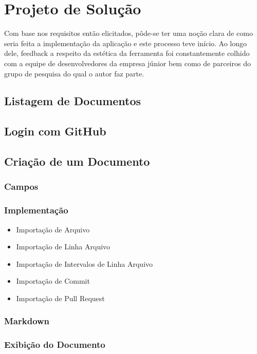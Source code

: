 \chapter{Projeto de Solução}

Com base nos requisitos então elicitados, pôde-se ter uma noção clara de como seria feita a implementação da aplicação e este processo teve início. Ao longo dele, feedback a respeito da estética da ferramenta foi constantemente colhido com a equipe de desenvolvedores da empresa júnior bem como de parceiros do grupo de pesquisa do qual o autor faz parte.

\section{Listagem de Documentos}

\section{Login com GitHub}

\section{Criação de um Documento}

\subsection{Campos}
\subsection{Implementação}

\begin{itemize}
  \item Importação de Arquivo
  \item Importação de Linha Arquivo
  \item Importação de Intervalos de Linha Arquivo
  \item Importação de Commit
  \item Importação de Pull Request
\end{itemize}

\subsection{Markdown}
\subsection{Exibição do Documento}

